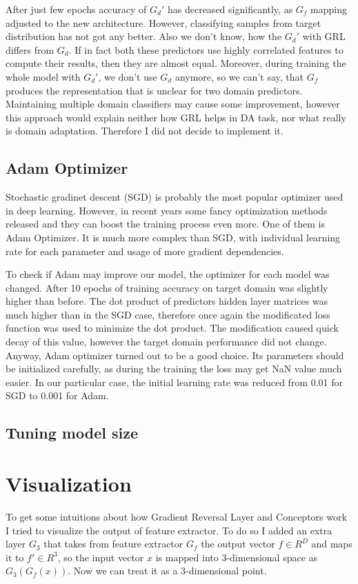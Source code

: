 \documentclass{article}
\begin{document}
\par
After just few epochs accuracy of $G_{d}'$ has decreased significantly, as $G_{f}$ mapping adjusted to the new architecture. However, classifying samples from target distribution has not got any better. Also we don't know, how the $G_{d}'$ with GRL differs from $G_{d}$. If in fact both these predictors use highly correlated features to compute their results, then they are almost equal. Moreover, during training the whole model with $G_{d}'$, we don't use $G_{d}$ anymore, so we can't say, that $G_{f}$ produces the representation that is unclear for two domain predictors. Maintaining multiple domain classifiers may cause some improvement, however this approach would explain neither how GRL helps in DA task, nor what really is domain adaptation. Therefore I did not decide to implement it.
\subsection{Adam Optimizer}
Stochastic gradinet descent (SGD) is probably the most popular optimizer used in deep learning. However, in recent years some fancy optimization methods released and they can boost the training process even more. One of them is Adam Optimizer. It is much more complex than SGD, with individual learning rate for each parameter and usage of more gradient dependencies. 
\par
To check if Adam may improve our model, the optimizer for each model was changed. After 10 epochs of training accuracy on target domain was slightly higher than before. The dot product of predictors hidden layer matrices was much higher than in the SGD case, therefore once again the modificated loss function was used to minimize the dot product. The modification caused quick decay of this value, however the target domain performance did not change. Anyway, Adam optimizer turned out to be a good choice. Its parameters should be initialized carefully, as during the training the loss may get NaN value much easier. In our particular case, the initial learning rate was reduced from 0.01 for SGD to 0.001 for Adam.

\subsection{Tuning model size}

\section{Visualization}
\par
To get some intuitions about how Gradient Reversal Layer and Conceptors work I tried to visualize the output of feature extractor. To do so I added an extra layer $G_{3}$ that takes from feature extractor $G_{f}$ the output vector ${ f } \in { R } ^ { D }$ and maps it to ${f'} \in {R}^{3}$, so the input vector ${x}$ is mapped into 3-dimensional space as $G_{3}(G_{f}(x))$. Now we can treat it as a 3-dimensional point. 
\end{document}
